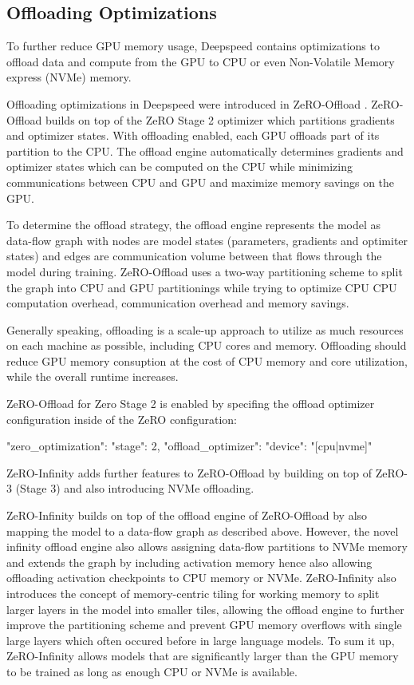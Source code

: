 \subsection{Offloading Optimizations}
\label{subsection:offloading}

To further reduce GPU memory usage, Deepspeed contains optimizations to offload 
data and compute from the GPU to CPU or even Non-Volatile Memory express (NVMe) 
memory. 

Offloading optimizations in Deepspeed were introduced in ZeRO-Offload 
\cite*{DBLP:journals/corr/abs-2101-06840}. ZeRO-Offload builds on top of 
the ZeRO Stage 2 optimizer which partitions gradients and optimizer states. 
With offloading enabled, each GPU offloads part of its partition to the CPU. 
The offload engine automatically determines gradients and optimizer states 
which can be computed on the CPU while minimizing communications between CPU 
and GPU and maximize memory savings on the GPU.

To determine the offload strategy, the offload engine represents the model as 
data-flow graph with nodes are model states (parameters, gradients and 
optimiter states) and edges are communication volume between that flows through 
the model during training. ZeRO-Offload uses a two-way partitioning scheme to 
split the graph into CPU and GPU partitionings while trying to optimize CPU 
CPU computation overhead, communication overhead and memory savings. 

Generally speaking, offloading is a scale-up approach to utilize as much 
resources on each machine as possible, including CPU cores and memory. 
Offloading should reduce GPU memory consuption at the cost of CPU memory and 
core utilization, while the overall runtime increases.

ZeRO-Offload for Zero Stage 2 is enabled by specifing the offload optimizer 
configuration inside of the ZeRO configuration:

\begin{json}
"zero_optimization": {
    "stage": 2,
    "offload_optimizer": {
        "device": "[cpu|nvme]"
    }
}
\end{json}

ZeRO-Infinity \cite*{DBLP:journals/corr/abs-2104-07857} adds further features to 
ZeRO-Offload by building on top of ZeRO-3 (Stage 3) and also introducing NVMe 
offloading.

ZeRO-Infinity builds on top of the offload engine of ZeRO-Offload by also 
mapping the model to a data-flow graph as described above. However, the 
novel infinity offload engine also allows assigning data-flow partitions 
to NVMe memory and extends the graph by including activation memory hence 
also allowing offloading activation checkpoints to CPU memory or NVMe. 
ZeRO-Infinity also introduces the concept of memory-centric tiling for 
working memory to split larger layers in the model into smaller tiles, 
allowing the offload engine to further improve the partitioning scheme and 
prevent GPU memory overflows with single large layers which often occured 
before in large language models.   To sum it up, ZeRO-Infinity allows 
models that are significantly larger than the GPU memory to be trained as 
long as enough CPU or NVMe is available. 


